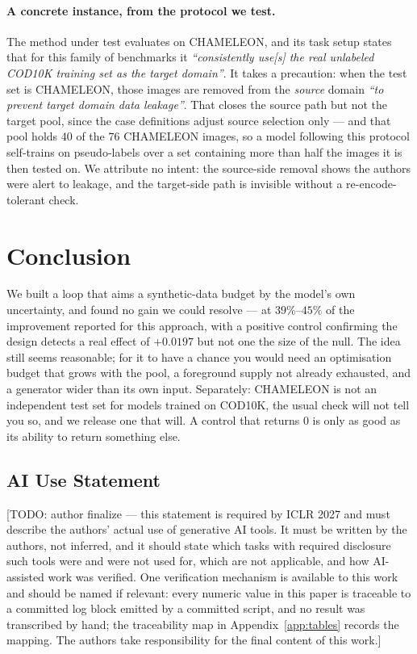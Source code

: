 \documentclass{article} %
\begin{document}
\paragraph{A concrete instance, from the protocol we test.} The method under test evaluates on
CHAMELEON, and its task setup states that for this family of benchmarks it \emph{``consistently use[s] the real
unlabeled COD10K training set as the target domain''}. It takes a precaution: when the test set is
CHAMELEON, those images are removed from the \emph{source} domain \emph{``to prevent target domain
data leakage''}. That closes the source path but not the target pool, since the case definitions adjust source
selection only --- and that pool holds $40$ of the $76$ CHAMELEON images, so a model following this
protocol self-trains on pseudo-labels over a set containing more than half the images it is then
tested on. We attribute no intent: the source-side removal shows the authors were alert to leakage,
and the target-side path is invisible without a re-encode-tolerant check.

\section{Conclusion}
\label{sec:conclusion}

We built a loop that aims a synthetic-data budget by the model's own uncertainty, and found no gain
we could resolve --- at $39\%$--$45\%$ of the improvement reported for this approach, with a positive
control confirming the design detects a real effect of $+0.0197$ but not one the size of the
null. The idea still seems reasonable; for it to have a chance you would need an optimisation budget that
grows with the pool, a foreground supply not already exhausted, and a generator wider than its own
input. Separately: CHAMELEON is not an independent test set for models trained on
COD10K, the usual check will not tell you so, and we release one that will. A control that returns $0$ is only as good as its
ability to return something else.

\subsection*{AI Use Statement}

[TODO: author finalize --- this statement is required by ICLR 2027 and must describe the authors'
actual use of generative AI tools. It must be written by the authors, not inferred, and it should
state which tasks with required disclosure such tools were and were not used for, which are not
applicable, and how AI-assisted work was verified. One verification mechanism is available to this
work and should be named if relevant: every numeric value in this paper is traceable to a committed
log block emitted by a committed script, and no result was transcribed by hand; the traceability map
in Appendix~\ref{app:tables} records the mapping. The authors take responsibility for the final
content of this work.]
\end{document}

